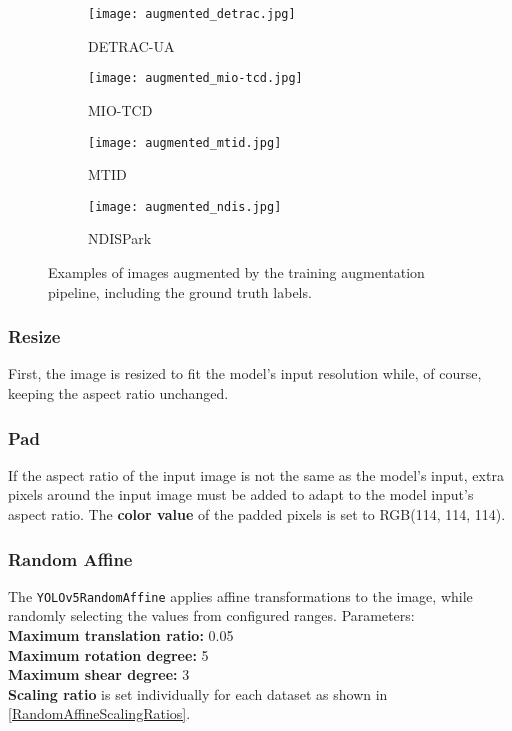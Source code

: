 \begin{figure}[t]
    \centering
    \begin{subfigure}[b]{0.49\textwidth}
        \texttt{[image: augmented\_detrac.jpg]}
        \caption{DETRAC-UA}
    \end{subfigure}
    \begin{subfigure}[b]{0.49\textwidth}
        \texttt{[image: augmented\_mio-tcd.jpg]}
        \caption{MIO-TCD}
    \end{subfigure}
    \begin{subfigure}[b]{0.49\textwidth}
        \texttt{[image: augmented\_mtid.jpg]}
        \caption{MTID}
    \end{subfigure}
    \begin{subfigure}[b]{0.49\textwidth}
        \texttt{[image: augmented\_ndis.jpg]}
        \caption{NDISPark}
    \end{subfigure}
    \caption{Examples of images augmented by the training augmentation pipeline,
    including the ground truth labels.}
    \label{AugmentedExamples}
\end{figure}


\subsubsection*{Resize}

First, the image is resized to fit the model's input resolution while, of
course, keeping the aspect ratio unchanged.

\subsubsection*{Pad}

If the aspect ratio of the input image is not the same as the model's input, extra pixels around the input image must be added
to adapt to the model input's aspect ratio. The \textbf{color value} of the padded pixels is set to RGB(114, 114, 114).

\subsubsection*{Random Affine}

The \texttt{YOLOv5RandomAffine} applies affine transformations to the image,
while randomly selecting the values from configured ranges. Parameters:\\
\textbf{Maximum translation ratio:} 0.05 \\
\textbf{Maximum rotation degree:} 5 \\
\textbf{Maximum shear degree:} 3 \\
\textbf{Scaling ratio} is set individually for each dataset as shown in \autoref{RandomAffineScalingRatios}.


